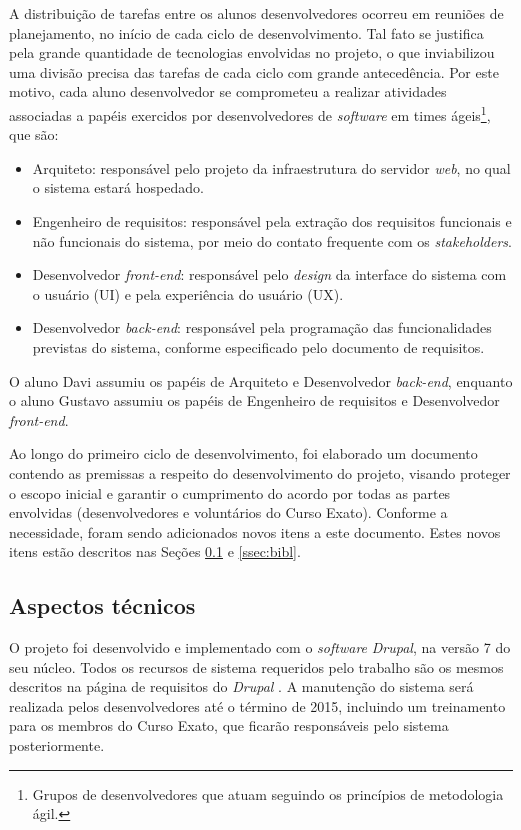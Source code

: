 \documentclass[a4paper]{article}
\begin{document}
A distribuição de tarefas entre os alunos desenvolvedores ocorreu em reuniões de planejamento, no início de cada ciclo de desenvolvimento. Tal fato se justifica pela grande quantidade de tecnologias envolvidas no projeto, o que inviabilizou uma divisão precisa das tarefas de cada ciclo com grande antecedência. Por este motivo, cada aluno desenvolvedor se comprometeu a realizar atividades associadas a papéis exercidos por desenvolvedores de \textit{software} em times ágeis\footnote{Grupos de desenvolvedores que atuam seguindo os princípios de metodologia ágil.}, que são:
\begin{itemize}
\item Arquiteto: responsável pelo projeto da infraestrutura do servidor \textit{web}, no qual o sistema estará hospedado.
\item Engenheiro de requisitos: responsável pela extração dos requisitos funcionais e não funcionais do sistema, por meio do contato frequente com os \textit{stakeholders}.
\item Desenvolvedor \textit{front-end}: responsável pelo \textit{design} da interface do sistema com o usuário (UI) e pela experiência do usuário (UX).
\item Desenvolvedor \textit{back-end}: responsável pela programação das funcionalidades previstas do sistema, conforme especificado pelo documento de requisitos.
\end{itemize}

O aluno Davi assumiu os papéis de Arquiteto e Desenvolvedor \textit{back-end}, enquanto o aluno Gustavo assumiu os papéis de Engenheiro de requisitos e Desenvolvedor \textit{front-end}.

Ao longo do primeiro ciclo de desenvolvimento, foi elaborado um documento contendo as premissas a respeito do desenvolvimento do projeto, visando proteger o escopo inicial e garantir o cumprimento do acordo por todas as partes envolvidas (desenvolvedores e voluntários do Curso Exato). Conforme a necessidade, foram sendo adicionados novos itens a este documento. Estes novos itens estão descritos nas Seções \ref{ssec:tech} e \ref{ssec:bibl}.

\subsection{Aspectos técnicos}\label{ssec:tech}

O projeto foi desenvolvido e implementado com o \textit{software} \textit{Drupal}, na versão 7 do seu núcleo. Todos os recursos de sistema requeridos pelo trabalho são os mesmos descritos na página de requisitos do \textit{Drupal} \cite{requirements}. A manutenção do sistema será realizada pelos desenvolvedores até o término de 2015, incluindo um treinamento para os membros do Curso Exato, que ficarão responsáveis pelo sistema posteriormente.
\end{document}

